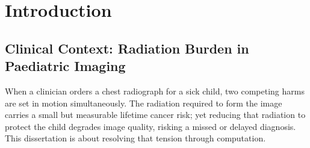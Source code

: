 \documentclass[12pt, a4paper, twoside, openright]{book}
\begin{document}
\mainmatter
{}
%

\chapter{Introduction}
\label{chap:intro}

\section{Clinical Context: Radiation Burden in Paediatric Imaging}
\label{sec:intro:clinical}

When a clinician orders a chest radiograph for a sick child, two competing harms are set in motion simultaneously. The radiation required to form the image carries a small but measurable lifetime cancer risk; yet reducing that radiation to protect the child degrades image quality, risking a missed or delayed diagnosis. This dissertation is about resolving that tension through computation.
\end{document}
